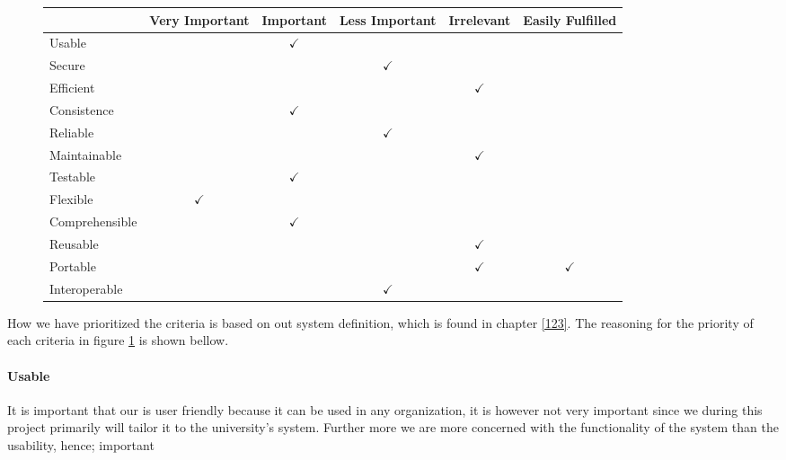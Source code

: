 \begin{figure}[htbp]
	\centering
		\begin{tabular}{| l | m{} | m{}| m{}| m{}|m{}|} \hline
		  & Very  Important & Important & Less Important & Irrelevant & Easily Fulfilled \\ \hline
		Usable  & & \multicolumn{1}{c|}{$\checkmark$} & & & \\ \hline
		Secure  & & & \multicolumn{1}{c|}{$\checkmark$} & & \\ \hline
		Efficient & & & & \multicolumn{1}{c|}{$\checkmark$} & \\ \hline
		Consistence  & & \multicolumn{1}{c|}{$\checkmark$} & & & \\ \hline
		Reliable  & & & \multicolumn{1}{c|}{$\checkmark$} & & \\ \hline
		Maintainable  & & & & \multicolumn{1}{c|}{$\checkmark$} & \\ \hline
		Testable  & & \multicolumn{1}{c|}{$\checkmark$} & & & \\ \hline
		Flexible  & \multicolumn{1}{c|}{$\checkmark$} & & & & \\ \hline
		Comprehensible  & & \multicolumn{1}{c|}{$\checkmark$} & & & \\ \hline
		Reusable  & & & & \multicolumn{1}{c|}{$\checkmark$} & \\ \hline
		Portable & & & & \multicolumn{1}{c|}{$\checkmark$} & \multicolumn{1}{c|}{$\checkmark$} \\ \hline
		Interoperable & & & \multicolumn{1}{c|}{$\checkmark$} & & \\ \hline
		\end{tabular}
	\label{fig:prioritizedCrit}
\end{figure}

How we have prioritized the criteria is based on out system definition, which is found in chapter \ref{123}. The reasoning for the priority of each criteria in figure \ref{fig:prioritizedCrit} is shown bellow.

\paragraph{Usable}
It is important that our \hdesk[] is user friendly because it can be used in any organization, it is however not very important since we during this project primarily will tailor it to the university's system.
Further more we are more concerned with the functionality of the system than the usability, hence; important 
